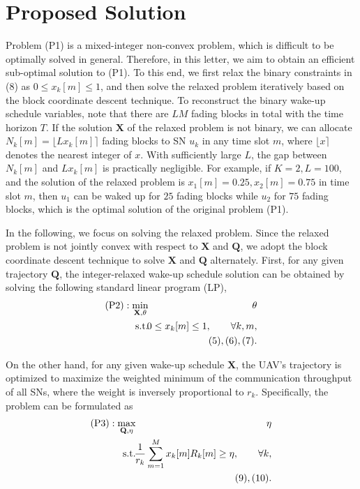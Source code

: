 \documentclass[journal]{IEEEtran}
\begin{document}
\section{Proposed Solution}\label{Problem}
Problem (P1) is a mixed-integer non-convex problem, which is difficult to be optimally solved
in general. Therefore, in this letter, we aim to obtain an efficient sub-optimal solution to (P1). To this end, we first relax the
binary constraints in (8) as $0\leq x_k[m] \leq 1$, and then solve the relaxed problem iteratively based on the block coordinate descent technique. To reconstruct the binary wake-up schedule variables, note that there are $LM$ fading blocks in total with the time horizon $T$. If the solution $\mathbf{X}$ of the relaxed problem is not binary, we can allocate $N_k[m]=\lfloor Lx_k[m]\rceil$ fading blocks to SN $u_k$ in any time slot $m$, where $\lfloor x\rceil$ denotes the nearest integer of $x$. With sufficiently large $L$, the gap between $N_k[m]$ and $Lx_k[m]$ is practically negligible. For example, if $K=2, L=100$, and the solution of the relaxed problem is $x_1[m]=0.25, x_2[m]=0.75$ in time slot $m$, then $u_1$ can be waked up for $25$ fading blocks while $u_2$ for $75$ fading blocks, which is the optimal solution of the original problem (P1).

In the following, we focus on solving the relaxed problem. Since the relaxed problem is not jointly convex with respect to $\mathbf{X}$ and $\mathbf{Q}$, we adopt the block coordinate descent technique to solve $\mathbf{X}$ and $\mathbf{Q}$ alternately. First, for any given trajectory $\mathbf{Q}$, the integer-relaxed wake-up schedule solution can be obtained by solving the following standard linear program (LP),
\begin{eqnarray}
\text{(P2)}:\min\limits_{\mathbf{X},\theta}&&\hspace{-4mm} \theta \nonumber\\
\text{s.t.} &&\hspace{-4mm} 0\leq x_{k}[m]\leq 1, \quad\quad \forall k,m, \\
&&\hspace{-4mm}(5),(6),(7).\nonumber
\end{eqnarray}

On the other hand, for any given wake-up schedule $\mathbf{X}$, the UAV's trajectory is optimized to maximize the weighted minimum of the communication throughput of all SNs, where the weight is inversely proportional to $r_k$. Specifically, the problem can be formulated as
\begin{eqnarray}
\text{(P3)}:\max\limits_{\mathbf{Q},\eta}&&\hspace{-4mm}  \eta \nonumber\\
\text{s.t.} &&\hspace{-4mm}\frac{1}{r_k}\sum_{m=1}^{M}x_k[m]R_k[m]\geq \eta, \quad\quad\forall k,\\
&&\hspace{-4mm}(9),(10). \nonumber
\end{eqnarray}
\end{document}

